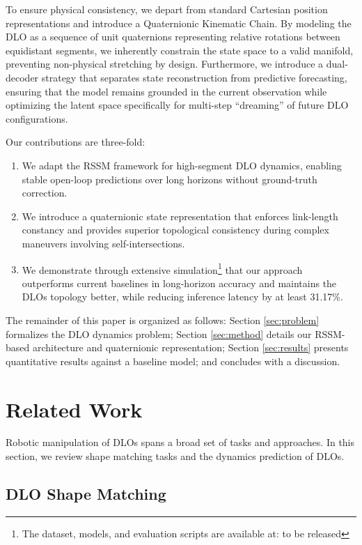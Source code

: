 \documentclass[letterpaper, 10 pt, conference]{ieeeconf}  %
\begin{document}
To ensure physical consistency, we depart from standard Cartesian position representations and introduce a Quaternionic Kinematic Chain. By modeling the DLO as a sequence of unit quaternions representing relative rotations between equidistant segments, we inherently constrain the state space to a valid manifold, preventing non-physical stretching by design. Furthermore, we introduce a dual-decoder strategy that separates state reconstruction from predictive forecas\-ting, ensuring that the model remains grounded in the current observation while optimizing the latent space specifically for multi-step ``dreaming'' of future DLO configurations.

Our contributions are three-fold:
\begin{enumerate}
\item We adapt the RSSM framework for high-segment DLO dynamics, enabling stable open-loop predictions over long horizons without ground-truth correction.
\item We introduce a quaternionic state representation that enforces link-length constancy and provides superior topological consistency during complex maneuvers involving self-intersections.
\item We demonstrate through extensive simulation\footnote{The dataset, models, and evaluation scripts are  available at: to be released} that our approach outperforms current baselines in long-horizon accuracy and maintains the DLOs topology better, while reducing inference latency by at least 31.17\%.
\end{enumerate}

The remainder of this paper is organized as follows: Section \ref{sec:problem} formalizes the DLO dynamics problem; Section \ref{sec:method} details our RSSM-based architecture and quaternionic representation; Section \ref{sec:results} presents quantitative results against a baseline model; and concludes with a discussion.



\section{Related Work}
\label{sec:related}

Robotic manipulation of DLOs spans a broad set of tasks and approaches. In this section, we review shape matching tasks and the dynamics prediction of DLOs.

\subsection{DLO Shape Matching}
\end{document}

